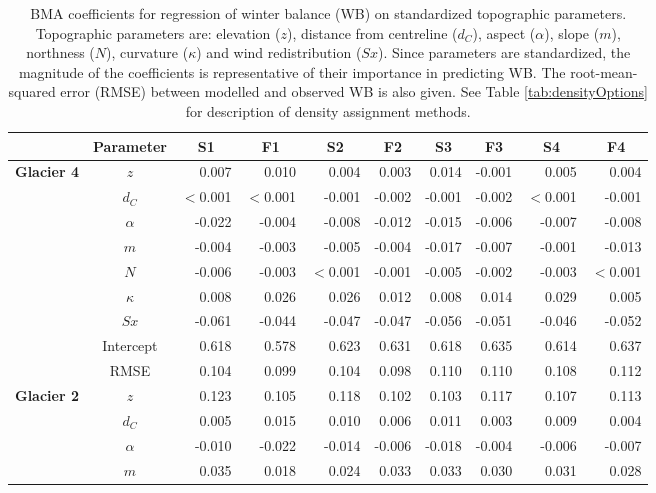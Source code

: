 \documentclass{sfuthesis}
\newcommand{\params}{Topographic parameters are: elevation ($z$), distance from centreline ($d_C$), aspect ($\alpha$), slope ($m$), northness ($N$), curvature ($\kappa$) and wind redistribution ($Sx$). }
\begin{document}
{\begin{table}
\footnotesize
\centering
\caption[BMA coefficients for regression of winter balance (WB) on standardized topographic parameters]{BMA coefficients for regression of winter balance (WB) on standardized topographic parameters. \params  Since parameters are standardized, the magnitude of the coefficients is representative of their importance in predicting WB. The root-mean-squared error (RMSE) between modelled and observed WB is also given. See Table \ref{tab:densityOptions} for description of density assignment methods.}
\label{tab:BMAcoeffFull}
\begin{tabular}{ccrrrrrrrr}
\textbf{} & \textbf{Parameter} & \multicolumn{1}{c}{\textbf{S1}} & \multicolumn{1}{c}{\textbf{F1}} & \multicolumn{1}{c}{\textbf{S2}} & \multicolumn{1}{c}{\textbf{F2}} & \multicolumn{1}{c}{\textbf{S3}} & \multicolumn{1}{c}{\textbf{F3}} & \multicolumn{1}{c}{\textbf{S4}} & \multicolumn{1}{c}{\textbf{F4}} \\ \hline \hline
\multirow{9}{*}{\textbf{Glacier 4}} & $z$ & 0.007 & 0.010 & 0.004 & 0.003 & 0.014 & -0.001 & 0.005 & 0.004 \\
 & $d_C$ & $<$0.001 & $<$0.001 & -0.001 & -0.002 & -0.001 & -0.002 & $<$0.001 & -0.001 \\
 & $\alpha$ & -0.022 & -0.004 & -0.008 & -0.012 & -0.015 & -0.006 & -0.007 & -0.008 \\
 & $m$ & -0.004 & -0.003 & -0.005 & -0.004 & -0.017 & -0.007 & -0.001 & -0.013 \\
 & $N$ & -0.006 & -0.003 & $<$0.001 & -0.001 & -0.005 & -0.002 & -0.003 & $<$0.001 \\
 & $\kappa$ & 0.008 & 0.026 & 0.026 & 0.012 & 0.008 & 0.014 & 0.029 & 0.005 \\
 & $Sx$ & -0.061 & -0.044 & -0.047 & -0.047 & -0.056 & -0.051 & -0.046 & -0.052 \\
 & Intercept & 0.618 & 0.578 & 0.623 & 0.631 & 0.618 & 0.635 & 0.614 & 0.637 \\
 & RMSE & 0.104 & 0.099 & 0.104 & 0.098 & 0.110 & 0.110 & 0.108 & 0.112 \\ \hline
\multirow{9}{*}{\textbf{Glacier 2}} & $z$ & 0.123 & 0.105 & 0.118 & 0.102 & 0.103 & 0.117 & 0.107 & 0.113 \\
 & $d_C$ & 0.005 & 0.015 & 0.010 & 0.006 & 0.011 & 0.003 & 0.009 & 0.004 \\
 & $\alpha$ & -0.010 & -0.022 & -0.014 & -0.006 & -0.018 & -0.004 & -0.006 & -0.007 \\
 & $m$ & 0.035 & 0.018 & 0.024 & 0.033 & 0.033 & 0.030 & 0.031 & 0.028 \\

\end{tabular}
\end{table}}
\end{document}
